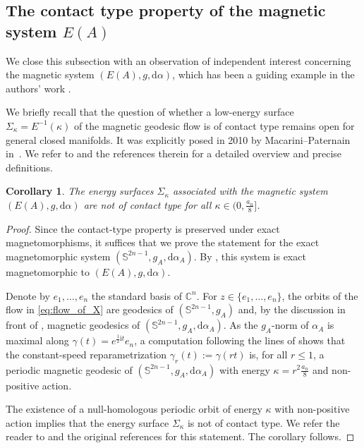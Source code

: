 \documentclass[11pt,reqno]{amsart}
\newcommand{\C}{\mathbb C}
\theoremstyle{plain}
\newtheorem{cor}[thm]{Corollary}
\theoremstyle{definition}
\numberwithin{equation}{section}
\def\d{\delta}
\def\d{\delta}
\def\d{{\mathrm{d}}}
\def\S{{\mathbb{S}^{2n-1}}}
\def\i{{\mathrm{i}}}
\begin{document}
\subsection{The contact type property of the magnetic system $E(A)$}\label{ss:The contact type property of the magnetic system}
We close this subsection with an observation of independent interest concerning the magnetic system $(E(A),g,\d\alpha)$, which has been a guiding example in the authors' work \cite{DMS25Contact,QuadraticgrowthLinaTom}. 

We briefly recall that the question of whether a low-energy surface $\Sigma_\kappa=E^{-1}(\kappa)$ of the magnetic geodesic flow is of contact type remains open for general closed manifolds. It was explicitly posed in 2010 by Macarini--Paternain in~\cite[p.2]{MP10}. We refer to \cite{DMS25Contact} and the references therein for a detailed overview and precise definitions.

\begin{cor}
The energy surfaces $\Sigma_\kappa$ associated with the magnetic system $(E(A), g,\d\alpha)$ are not of contact type for all $\kappa\in (0, \frac{a_n}{8}]$.
\end{cor}
\begin{proof}
Since the contact-type property is preserved under exact magnetomorphisms, it suffices that we prove the statement for the exact magnetomorphic system $(\S,g_A,\d\alpha_A)$. By , this system is exact magnetomorphic to $(E(A),g,\d\alpha)$.

Denote by $e_1,\dots, e_n$ the standard basis of $\C^n$. For $z\in\{e_1,\dots, e_n\}$, the orbits of the flow in \eqref{eq:flow_of_X} are geodesics of $(\S,g_A)$ and, by the discussion in front of \cite[Lemma 2.2]{ABM}, magnetic geodesics of $(\S,g_A,\d\alpha_A)$. As the $g_A$-norm of $\alpha_A$ is maximal along $\gamma(t)=e^{\frac12 \i t} e_n$, a computation following the lines of \cite[§3.3]{DMS25Contact} shows that the constant-speed reparametrization $\gamma_r(t):=\gamma(r t)$ is, for all $r \leq 1$, a periodic magnetic geodesic of $(\S,g_A,\d\alpha_A)$ with energy $\kappa=r^2 \frac{a_n}{8}$ and non-positive action.

The existence of a null-homologous periodic orbit of energy $\kappa$ with non-positive action implies that the energy surface $\Sigma_\kappa$ is not of contact type. We refer the reader to \cite[App.~A]{DMS25Contact} and the original references \cite{ConMacPat2004,McDuff1987,Sullivan1976} for this statement. The corollary follows.
\end{proof}
\end{document}
